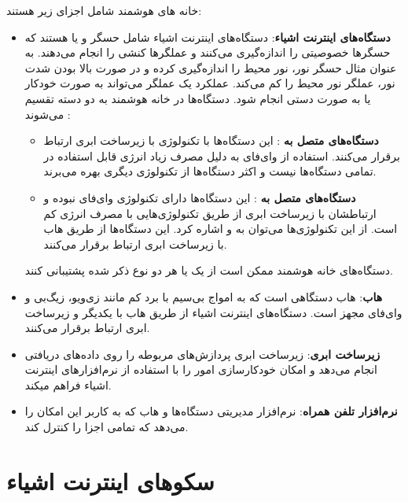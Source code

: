 خانه های هوشمند شامل اجزای زیر هستند:

\begin{itemize}
\item \textbf{دستگاه‌های اینترنت اشیاء}: دستگاه‌های اینترنت اشیاء شامل حسگر و یا  هستند که حسگرها خصوصیتی را اندازه‌گیری می‌کنند و عملگرها کنشی را انجام می‌دهند. به عنوان مثال حسگر نور، نور محیط را اندازه‌گیری کرده و در صورت بالا بودن شدت نور، عملگر نور محیط را کم می‌کند. عملکرد یک عملگر می‌تواند به صورت خودکار یا به صورت دستی انجام شود.
دستگاه‌ها در خانه‌ هوشمند به دو دسته تقسیم می‌شوند \cite{x252}:
\begin{itemize}
\item \textbf{دستگاه‌های متصل به }: این دستگاه‌ها با تکنولوژی  با زیرساخت ابری ارتباط برقرار می‌کنند. استفاده از وای‌فای به دلیل مصرف زیاد انرژی قابل استفاده در تمامی دستگاه‌ها نیست و اکثر دستگاه‌ها از تکنولوژی دیگری بهره می‌برند.
\item \textbf{دستگاه‌های متصل به }: این دستگاه‌ها دارای تکنولوژی وای‌فای نبوده و ارتباطشان با زیرساخت ابری از طریق تکنولوژی‌هایی با مصرف انرژی کم است. از این تکنولوژی‌ها می‌توان به  و  اشاره کرد. این دستگاه‌ها از طریق هاب با زیرساخت ابری ارتباط برقرار می‌کنند.
\end{itemize}

دستگاه‌های خانه هوشمند ممکن است از یک یا هر دو نوع ذکر شده پشتیبانی کنند.

\item \textbf{هاب}: هاب دستگاهی است که به امواج بی‌سیم با برد کم مانند زی‌ویو، زیگ‌بی و وای‌فای مجهز است. دستگاه‌های اینترنت اشیاء از طریق هاب با یکدیگر و زیرساخت ابری ارتباط برقرار می‌کنند.
\item \textbf{زیرساخت ابری}: زیرساخت ابری پردازش‌های مربوطه را روی داده‌های دریافتی انجام می‌دهد و امکان خودکارسازی امور را با استفاده از نرم‌افزارهای اینترنت اشیاء فراهم میکند.
\item \textbf{نرم‌افزار تلفن همراه}: نرم‌افزار مدیریتی دستگاه‌ها و هاب که به کاربر این امکان را می‌دهد که تمامی اجزا را کنترل کند.

\end{itemize}

\section{سکوهای اینترنت اشیاء‌}

